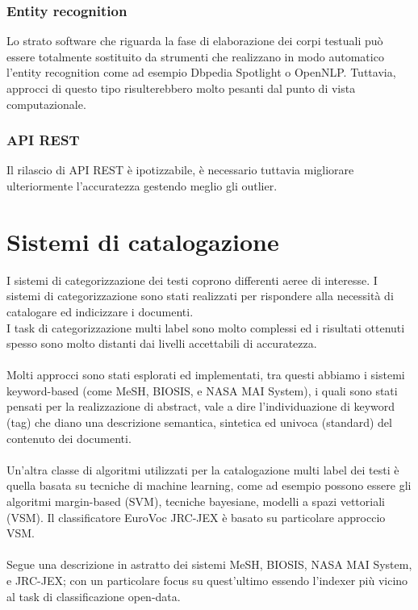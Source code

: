 \documentclass{article}
\theoremstyle{plain}
\theoremstyle{definition}
\begin{document}
\subsubsection{Entity recognition}
Lo strato software che riguarda la fase di elaborazione dei corpi testuali può essere totalmente sostituito da strumenti che realizzano in modo automatico l'entity recognition come ad esempio Dbpedia Spotlight o OpenNLP. Tuttavia, approcci di questo tipo risulterebbero molto pesanti dal punto di vista computazionale.
\subsubsection{API REST}
Il rilascio di API REST è ipotizzabile, è necessario tuttavia migliorare ulteriormente l'accuratezza gestendo meglio gli outlier.

\newpage


\section{Sistemi di catalogazione}
I sistemi di categorizzazione dei testi coprono differenti aeree di interesse. I sistemi di categorizzazione sono stati realizzati per rispondere alla necessità di catalogare ed indicizzare i documenti. 
\\
I task di categorizzazione multi label sono molto complessi ed i risultati ottenuti spesso sono molto distanti dai livelli accettabili di accuratezza.
\\
\\
Molti approcci sono stati esplorati ed implementati, tra questi abbiamo i sistemi keyword-based (come MeSH, BIOSIS, e NASA MAI System), i quali sono stati pensati per la realizzazione di abstract, vale a dire l'individuazione di keyword (tag) che diano una descrizione semantica, sintetica ed univoca (standard) del contenuto dei documenti. 
\\
\\
Un'altra classe di algoritmi utilizzati per la catalogazione multi label dei testi è quella basata su tecniche di machine learning, come ad esempio possono essere gli algoritmi margin-based (SVM), tecniche bayesiane, modelli a spazi vettoriali (VSM). Il classificatore EuroVoc JRC-JEX è basato su particolare approccio VSM.
\\
\\
Segue una descrizione in astratto dei sistemi MeSH, BIOSIS, NASA MAI System, e JRC-JEX; con un particolare focus su quest'ultimo essendo l'indexer più vicino al task di classificazione open-data.
\end{document}
